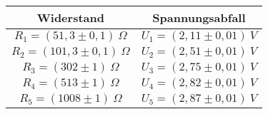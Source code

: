 \begin{tabular}[H]{c | c}
	Widerstand & Spannungsabfall\\ \hline \hline
	$R_1 = (51,3 \pm 0,1)\ \Omega$ & $U_1 = (2,11 \pm 0,01) \ V$ \\
	$R_2 = (101,3 \pm 0,1)\ \Omega$ & $U_2 = (2,51 \pm 0,01) \ V$ \\
	$R_3 = (302 \pm 1)\ \Omega$ & $U_3 = (2,75 \pm 0,01) \ V$ \\
	$R_4 = (513 \pm 1)\ \Omega$ & $U_4 = (2,82 \pm 0,01) \ V$ \\
	$R_5 = (1008 \pm 1)\ \Omega$ & $U_5 = (2,87 \pm 0,01) \ V$
\end{tabular}
